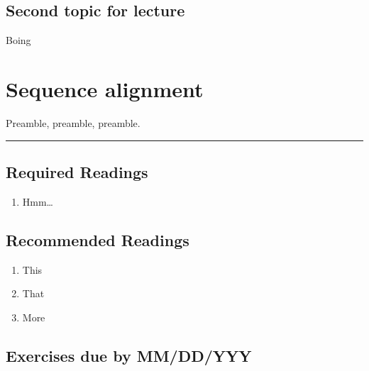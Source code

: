 \documentclass[]{book}
\providecommand{\tightlist}{%
  \setlength{\itemsep}{0pt}\setlength{\parskip}{0pt}}
\begin{document}
\hypertarget{second-topic-for-lecture-4}{%
\section{Second topic for lecture}\label{second-topic-for-lecture-4}}

Boing

\hypertarget{sequence-alignment}{%
\chapter{Sequence alignment}\label{sequence-alignment}}

Preamble, preamble, preamble.

\begin{center}\rule{0.5\linewidth}{\linethickness}\end{center}

\hypertarget{required-readings-5}{%
\section*{Required Readings}\label{required-readings-5}}

\begin{enumerate}
\def\labelenumi{\arabic{enumi}.}
\tightlist
\item
  Hmm\ldots{}
\end{enumerate}

\hypertarget{recommended-readings-5}{%
\section*{Recommended Readings}\label{recommended-readings-5}}

\begin{enumerate}
\def\labelenumi{\arabic{enumi}.}
\tightlist
\item
  This
\item
  That
\item
  More
\end{enumerate}

\hypertarget{exercises-due-by-mmddyyy-5}{%
\section*{Exercises due by MM/DD/YYY}\label{exercises-due-by-mmddyyy-5}}
\end{document}
